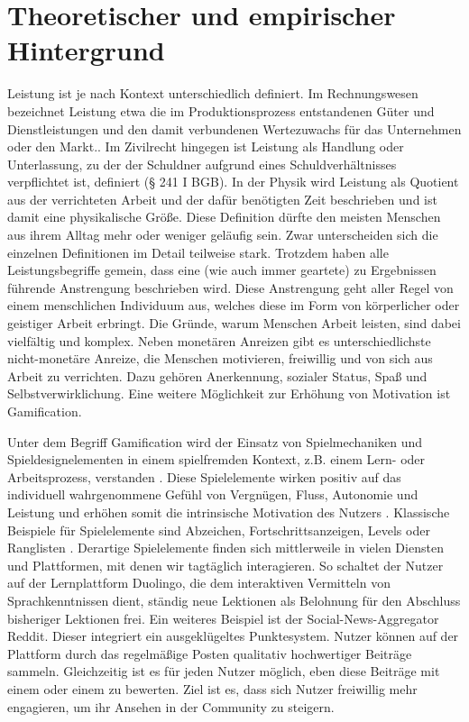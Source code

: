 \section{Theoretischer und empirischer Hintergrund}
Leistung ist je nach Kontext unterschiedlich definiert. Im Rechnungswesen bezeichnet Leistung etwa die im Produktionsprozess entstandenen Güter und Dienstleistungen und den damit verbundenen Wertezuwachs für das Unternehmen oder den Markt.\cite{woeltje2010abc}. Im Zivilrecht hingegen ist Leistung als Handlung oder Unterlassung, zu der der Schuldner aufgrund eines Schuldverhältnisses verpflichtet ist, definiert (§ 241 I BGB). In der Physik wird Leistung als Quotient aus der verrichteten Arbeit und der dafür benötigten Zeit beschrieben und ist damit eine physikalische Größe. Diese Definition dürfte den meisten Menschen aus ihrem Alltag mehr oder weniger geläufig sein. Zwar unterscheiden sich die einzelnen Definitionen im Detail teilweise stark. Trotzdem haben alle Leistungsbegriffe gemein, dass eine (wie auch immer geartete) zu Ergebnissen führende Anstrengung beschrieben wird. Diese Anstrengung geht aller Regel von einem menschlichen Individuum aus, welches diese im Form von körperlicher oder geistiger Arbeit erbringt. Die Gründe, warum Menschen Arbeit leisten, sind dabei vielfältig und komplex. Neben monetären Anreizen gibt es unterschiedlichste nicht-monetäre Anreize, die Menschen motivieren, freiwillig und von sich aus Arbeit zu verrichten. Dazu gehören Anerkennung, sozialer Status, Spaß und Selbstverwirklichung. Eine weitere Möglichkeit zur Erhöhung von Motivation ist Gamification. 

Unter dem Begriff Gamification wird der Einsatz von Spielmechaniken und Spieldesignelementen in einem spielfremden Kontext, z.B. einem Lern- oder Arbeitsprozess, verstanden \cite{deterding_game_2011}. Diese Spielelemente wirken positiv auf das individuell wahrgenommene Gefühl von Vergnügen, Fluss, Autonomie und Leistung und erhöhen somit die intrinsische Motivation des Nutzers \cite{ryan2006motivational}. Klassische Beispiele für Spielelemente sind Abzeichen, Fortschrittsanzeigen, Levels oder Ranglisten \cite{koch2013gamification}. Derartige Spielelemente finden sich mittlerweile in vielen Diensten und Plattformen, mit denen wir tagtäglich interagieren. So schaltet der Nutzer auf der Lernplattform Duolingo, die dem interaktiven Vermitteln von Sprachkenntnissen dient, ständig neue Lektionen als Belohnung für den Abschluss bisheriger Lektionen frei. Ein weiteres Beispiel ist der Social-News-Aggregator Reddit. Dieser integriert ein ausgeklügeltes Punktesystem. Nutzer können auf der Plattform durch das regelmäßige Posten qualitativ hochwertiger Beiträge  sammeln. Gleichzeitig ist es für jeden Nutzer möglich, eben diese Beiträge mit einem  oder einem  zu bewerten. Ziel ist es, dass sich Nutzer freiwillig mehr engagieren, um ihr Ansehen in der Community zu steigern.


